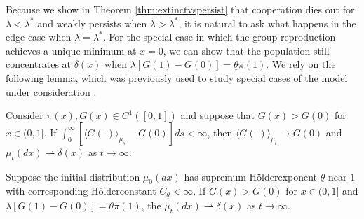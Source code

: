 \documentclass[11pt]{article}
\numberwithin{equation}{section}
\newcommand{\holder}{H{\"o}lder\:}
\begin{document}
{Because we show in Theorem \ref{thm:extinctvspersist} that cooperation dies out for $\lambda < \lambda^*$ and weakly persists when $\lambda > \lambda^*$, it is natural to ask what happens in the edge case when $\lambda = \lambda^*$. For the special case in which the group reproduction achieves a unique minimum at $x = 0$, we can show that the population still concentrates at $\delta(x)$ when $\lambda \left[ G(1) - G(0) \right] = \underline{\theta} \pi(1)$. We rely on the following lemma, which was previously used to study special cases of the model under consideration \cite{luo2017scaling,cooney2020pde}.

\begin{lemma} \label{lem:averagepayoffconvergence}
Consider $\pi(x), G(x) \in C^1([0,1])$ and suppose that $G(x) > G(0)$ for $x \in (0,1]$. If $\int_0^{\infty}\left[ \langle G(\cdot) \rangle_{\mu_s} - G(0) \right] ds < \infty$, then $\langle G(\cdot) \rangle_{\mu_t} \to G(0)$ and $\mu_t(dx) \rightharpoonup \delta(x)$ as $t \to \infty$. 
 
\end{lemma}

\begin{proposition} \label{prop:longtimedeltaequality}
Suppose the initial distribution $\mu_0(dx)$ has supremum \holder exponent $\underline{\theta}$ near $1$ with corresponding \holder constant $C_{\underline{\theta}} < \infty$. If $G(x) > G(0)$ for $x \in (0,1]$ and $\lambda \left[G(1) - G(0) \right] = \underline{\theta} \pi(1)$, the $\mu_t(dx) \rightharpoonup \delta(x)$ as $ t \to \infty$. 
\end{proposition}

}
\end{document}
